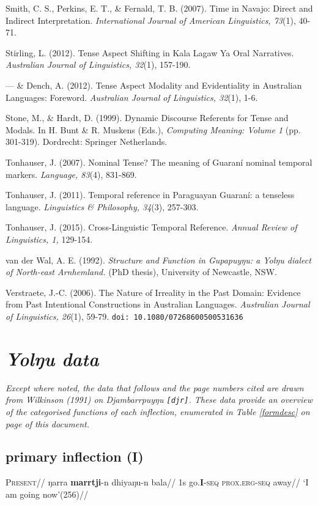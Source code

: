 \documentclass[12pt]{article}
\begin{document}
\begin{hangparas}{3em}{1}
Smith, C. S., Perkins, E. T., \& Fernald, T. B. (2007). Time in Navajo: Direct and Indirect Interpretation. \textit{International Journal of American Linguistics, 73}(1), 40-71. 


Stirling, L. (2012). Tense Aspect Shifting in Kala Lagaw Ya Oral Narratives. \textit{Australian Journal of Linguistics, 32}(1), 157-190. 


--- \& Dench, A. (2012). Tense Aspect Modality and Evidentiality in Australian Languages: Foreword. \textit{Australian Journal of Linguistics, 32}(1), 1-6. 

Stone, M., \& Hardt, D. (1999). Dynamic Discourse Referents for Tense and Modals. In H. Bunt \& R. Muskens (Eds.), \textit{Computing Meaning: Volume 1} (pp. 301-319). Dordrecht: Springer Netherlands.


Tonhauser, J. (2007). Nominal Tense? The meaning of Guaraní nominal temporal markers. \textit{Language, 83}(4), 831-869. 


Tonhauser, J. (2011). Temporal reference in Paraguayan Guaraní: a tenseless language. \textit{Linguistics \& Philosophy, 34}(3), 257-303. 

Tonhauser, J. (2015). Cross-Linguistic Temporal Reference. \textit{Annual Review of Linguistics, 1,} 129-154. 


van der Wal, A. E. (1992). \textit{Structure and Function in Gupapuyŋu: a Yolŋu dialect of North-east Arnhemland.} (PhD thesis), University of Newcastle, NSW.   


Verstraete, J.-C. (2006). The Nature of Irreality in the Past Domain: Evidence from Past Intentional Constructions in Australian Languages. \textit{Australian Journal of Linguistics, 26}(1), 59-79. \texttt{doi: 10.1080/07268600500531636}




\end{hangparas}
\setcounter{secnumdepth}{2} \newpage\appendix
\section{\textit{Yolŋu data}}
\textit{Except where noted, the data that follows and the page numbers cited are drawn from Wilkinson (1991) on Djambarrpuyŋu \texttt{[djr]}. These data provide an overview of the categorised functions of each inflection, enumerated in Table \ref{formdesc} on page \pageref{formdesc} of this document.}
\small
\subsection{primary inflection (I)}
\pex\begingl{}
\glpreamble\textsc{Present}//
\gla ŋarra \textbf{marrtji}-n dhiyaŋu-n bala//
\glb 1s go.\textbf{I}-\textsc{seq} \textsc{prox.erg-seq} away//
\glft`I am going now'\hfill(256)//
\endgl\xe
\end{document}
